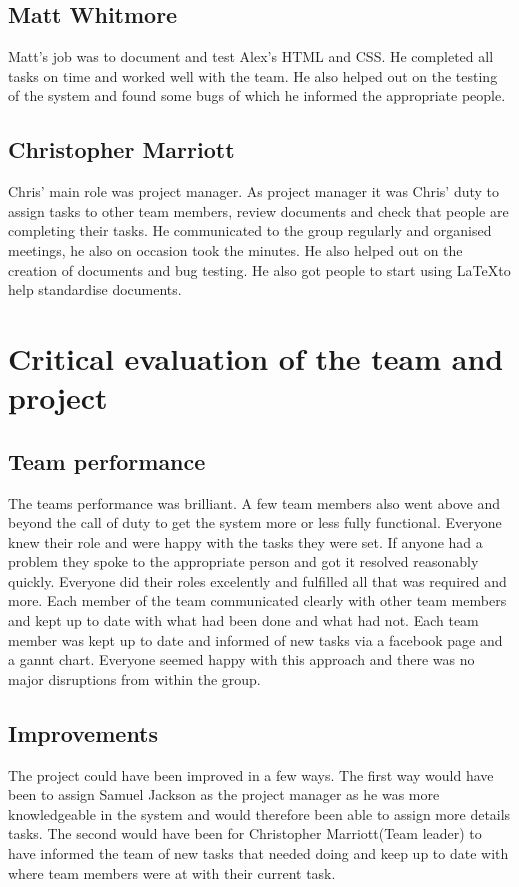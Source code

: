 \documentclass{project}
\begin{document}
\subsection{Matt Whitmore}
Matt's job was to document and test Alex's HTML and CSS. He completed all tasks on time and worked well with the team. He also helped out on the testing of the system and found some bugs of which he informed the appropriate people. 

\subsection{Christopher Marriott}
Chris' main role was project manager. As project manager it was Chris' duty to assign tasks to other team members, review documents and check that people are completing their tasks. He communicated to the group regularly and organised meetings, he also on occasion took the minutes. He also helped out on the creation of documents and bug testing. He also got people to start using \LaTeX to help standardise documents.

\section{Critical evaluation of the team and project}
\subsection{Team performance}
The teams performance was brilliant. A few team members also went above and beyond the call of duty to get the system more or less fully functional. Everyone knew their role and were happy with the tasks they were set. If anyone had a problem they spoke to the appropriate person and got it resolved reasonably quickly. Everyone did their roles excelently and fulfilled all that was required and more. Each member of the team communicated clearly with other team members and kept up to date with what had been done and what had not. Each team member was kept up to date and informed of new tasks via a facebook page and a gannt chart. Everyone seemed happy with this approach and there was no major disruptions from within the group.

\subsection{Improvements}
The project could have been improved in a few ways. The first way would have been to assign Samuel Jackson as the project manager as he was more knowledgeable in the system and would therefore been able to assign more details tasks. The second would have been for Christopher Marriott(Team leader) to have informed the team of new tasks that needed doing and keep up to date with where team members were at with their current task.
\end{document}
